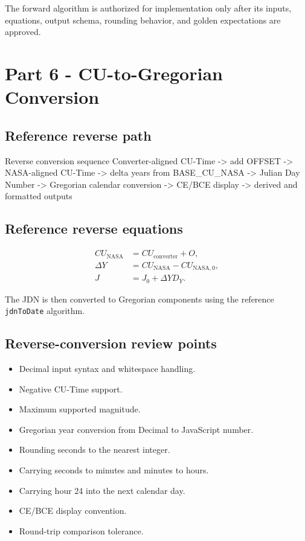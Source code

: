 \documentclass[11pt,letterpaper]{article}
\begin{document}
\begin{checkpointbox}
The forward algorithm is authorized for implementation only after its inputs,
equations, output schema, rounding behavior, and golden expectations are
approved.
\end{checkpointbox}

\section{Part 6 - CU-to-Gregorian Conversion}

\subsection{Reference reverse path}

\begin{codebox}{Reverse conversion sequence}
Converter-aligned CU-Time
  -> add OFFSET
  -> NASA-aligned CU-Time
  -> delta years from BASE_CU_NASA
  -> Julian Day Number
  -> Gregorian calendar conversion
  -> CE/BCE display
  -> derived and formatted outputs
\end{codebox}

\subsection{Reference reverse equations}

\begin{align*}
CU_{\mathrm{NASA}} &= CU_{\mathrm{converter}} + O, \\
\Delta Y &= CU_{\mathrm{NASA}} - CU_{\mathrm{NASA},0}, \\
J &= J_0 + \Delta Y D_Y.
\end{align*}

The JDN is then converted to Gregorian components using the reference
\texttt{jdnToDate} algorithm.

\subsection{Reverse-conversion review points}

\begin{itemize}
    \item Decimal input syntax and whitespace handling.
    \item Negative CU-Time support.
    \item Maximum supported magnitude.
    \item Gregorian year conversion from Decimal to JavaScript number.
    \item Rounding seconds to the nearest integer.
    \item Carrying seconds to minutes and minutes to hours.
    \item Carrying hour 24 into the next calendar day.
    \item CE/BCE display convention.
    \item Round-trip comparison tolerance.
\end{itemize}
\end{document}
